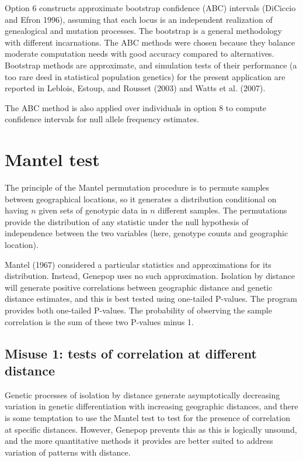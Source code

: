\documentclass[12pt,]{book}
\begin{document}
 Option 6 constructs approximate
bootstrap confidence (ABC) intervals (DiCiccio and Efron 1996), assuming
that each locus is an independent realization of genealogical and
mutation processes. The bootstrap is a general methodology with
different incarnations. The ABC methods were chosen because they balance
moderate computation needs with good accuracy compared to alternatives.
Bootstrap methods are approximate, and simulation tests of their
performance (a too rare deed in statistical population genetics) for the
present application are reported in Leblois, Estoup, and Rousset (2003)
and Watts et al. (2007).

The ABC method is also applied over individuals in option 8 to compute
confidence intervals for null allele frequency estimates.

\section{Mantel test}\label{mantel-test}

 The principle of the Mantel permutation procedure is
to permute samples between geographical locations, so it generates a
distribution conditional on having \(n\) given sets of genotypic data in
\(n\) different samples. The permutations provide the distribution of
any statistic under the null hypothesis of independence between the two
variables (here, genotype counts and geographic location).

Mantel (1967) considered a particular statistics and approximations for
its distribution. Instead, Genepop uses no such approximation. Isolation
by distance will generate positive correlations between geographic
distance and genetic distance estimates, and this is best tested using
one-tailed P-values. The program provides both one-tailed P-values. The
probability of observing the sample correlation is the sum of these two
P-values minus 1.

\subsection{Misuse 1: tests of correlation at different
distance}\label{misuse-1-tests-of-correlation-at-different-distance}

Genetic processes of isolation by distance generate asymptotically
decreasing variation in genetic differentiation with increasing
geographic distances, and there is some temptation to use the Mantel
test to test for the presence of correlation at specific distances.
However, Genepop prevents this as this is logically unsound, and the
more quantitative methods it provides are better suited to address
variation of patterns with distance.
\end{document}
